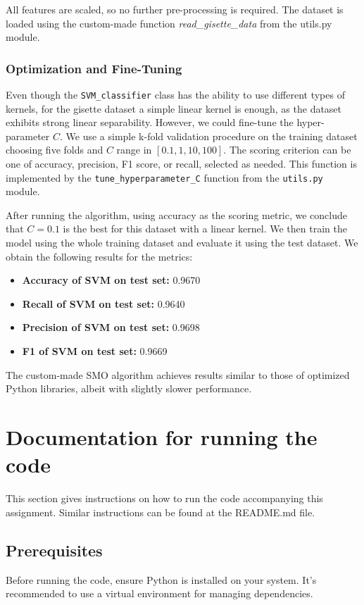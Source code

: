 \documentclass[10pt,a4paper]{article}
\newcounter{para}
\begin{document}
All features are scaled, so no further pre-processing is required. The dataset is loaded using the custom-made function \textit{read\_gisette\_data} from the utils.py module.


\subsubsection{Optimization and Fine-Tuning}

Even though the \texttt{SVM\_classifier} class has the ability to use different types of kernels, for the gisette dataset a simple linear kernel is enough, as the dataset exhibits strong linear separability. However, we could fine-tune the hyper-parameter \( C \). We use a simple k-fold validation procedure on the training dataset choosing five folds and \( C \) range in \([0.1, 1, 10, 100]\). The scoring criterion can be one of accuracy, precision, F1 score, or recall, selected as needed. This function is implemented by the \texttt{tune\_hyperparameter\_C} function from the \texttt{utils.py} module.

After running the algorithm, using accuracy as the scoring metric, we conclude that \( C=0.1 \) is the best for this dataset with a linear kernel. We then train the model using the whole training dataset and evaluate it using the test dataset. We obtain the following results for the metrics:

\begin{itemize}
	\item \textbf{Accuracy of SVM on test set:} 0.9670
	\item \textbf{Recall of SVM on test set:} 0.9640
	\item \textbf{Precision of SVM on test set:} 0.9698
	\item \textbf{F1 of SVM on test set:} 0.9669
\end{itemize}

The custom-made SMO algorithm achieves results similar to those of optimized Python libraries, albeit with slightly slower performance.

\section{Documentation for running the code}

This section gives instructions on how to run the code accompanying this assignment. Similar instructions can be found at the README.md file.

\subsection{Prerequisites}
Before running the code, ensure Python is installed on your system. It's recommended to use a virtual environment for managing dependencies.
\end{document}
